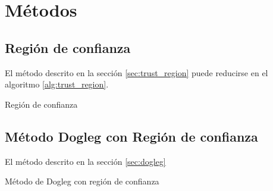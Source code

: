 \pagebreak
\section{Métodos}

\subsection{Región de confianza}

El método descrito en la sección \ref{sec:trust_region} puede reducirse en el algoritmo \ref{alg:trust_region}.

\begin{algorithm}
    \caption{Región de confianza}
    \label{alg:trust_region}
\end{algorithm}

\subsection{Método Dogleg con Región de confianza}

El método descrito en la sección \ref{sec:dogleg}

\begin{algorithm}
    \caption{Método de Dogleg con región de confianza}
    \label{alg:dogleg}
\end{algorithm}